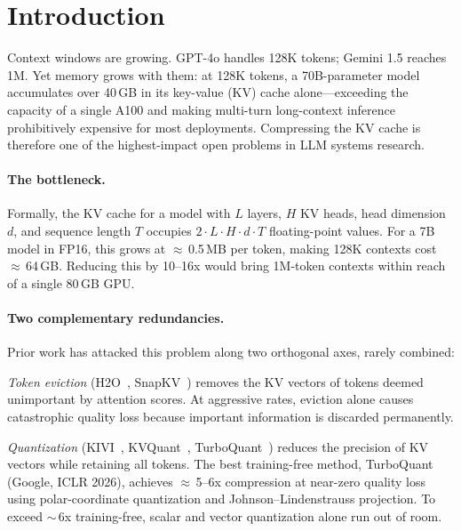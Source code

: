 
\section{Introduction}
\label{sec:intro}

Context windows are growing. GPT-4o handles 128K tokens; Gemini 1.5 reaches
1M. Yet memory grows with them: at 128K tokens, a 70B-parameter model
accumulates over 40\,GB in its key-value (KV) cache alone---exceeding the
capacity of a single A100 and making multi-turn long-context inference
prohibitively expensive for most deployments. Compressing the KV cache is
therefore one of the highest-impact open problems in LLM systems research.

\paragraph{The bottleneck.}
Formally, the KV cache for a model with $L$ layers, $H$ KV heads, head
dimension $d$, and sequence length $T$ occupies $2 \cdot L \cdot H \cdot d
\cdot T$ floating-point values. For a 7B model in FP16, this grows at
$\approx$\,0.5\,MB per token, making 128K contexts cost $\approx$\,64\,GB.
Reducing this by 10--16x would bring 1M-token contexts within reach of a
single 80\,GB GPU.

\paragraph{Two complementary redundancies.}
Prior work has attacked this problem along two orthogonal axes, rarely
combined:

\emph{Token eviction} (H2O~\cite{h2o2023}, SnapKV~\cite{snapkv2024}) removes
the KV vectors of tokens deemed unimportant by attention scores. At aggressive
rates, eviction alone causes catastrophic quality loss because important
information is discarded permanently.

\emph{Quantization} (KIVI~\cite{kivi2024}, KVQuant~\cite{kvquant2024},
TurboQuant~\cite{turboquant2026}) reduces the precision of KV vectors while
retaining all tokens. The best training-free method, TurboQuant (Google,
ICLR 2026), achieves $\approx$\,5--6x compression at near-zero quality loss
using polar-coordinate quantization and Johnson--Lindenstrauss projection.
To exceed $\sim$\,6x training-free, scalar and vector quantization alone
run out of room.

